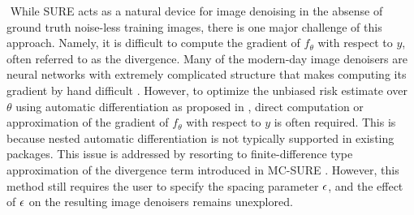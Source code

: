 $ $\newline
While SURE acts as a natural device for image denoising in the absense of ground truth noise-less training images, there is one major challenge of this approach. Namely, it is difficult to compute the gradient of $f_\theta$ with respect to $y$, often referred to as the divergence. Many of the modern-day image denoisers are neural networks with extremely complicated structure that makes computing its gradient by hand difficult \citep{zhang2017beyond,yang2017high,dong2014learning}. However, to optimize the unbiased risk estimate over $\theta$ using automatic differentiation as proposed in \citet{metzler2018unsupervised}, direct computation or approximation of the gradient of $f_\theta$ with respect to $y$ is often required. This is because nested automatic differentiation is not typically supported in existing packages. This issue is addressed by resorting to finite-difference type approximation of the divergence term introduced in MC-SURE \citep{ramani2008monte}. However, this method still requires the user to specify the spacing parameter $\epsilon$, and the effect of $\epsilon$ on the resulting image denoisers remains unexplored.








